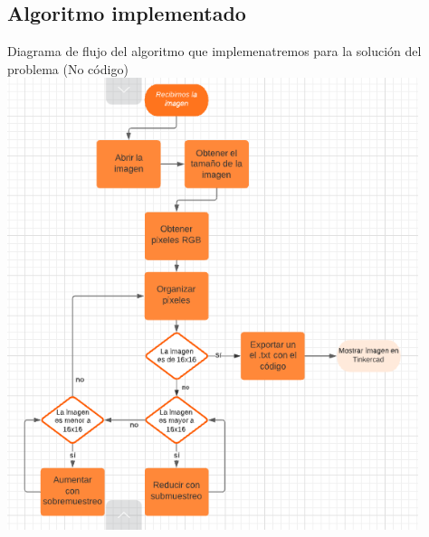 \documentclass{article}
\begin{document}
\subsection{Algoritmo implementado}
Diagrama de flujo del algoritmo que implemenatremos para la solución del problema (No código)\\
\includegraphics[width=12cm]{Imagenes/Algo.png}
\end{document}
